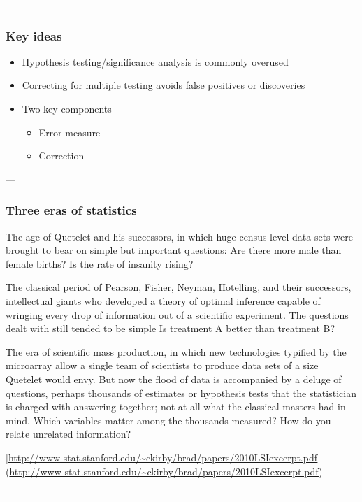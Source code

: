 \documentclass[10pt,article]{article}
\begin{document}
---
\subsubsection{Key ideas}
\label{sec:orga4bee19}

\begin{itemize}
\item Hypothesis testing/significance analysis is commonly overused
\item Correcting for multiple testing avoids false positives or discoveries
\item Two key components
\begin{itemize}
\item Error measure
\item Correction
\end{itemize}
\end{itemize}


---

\subsubsection{Three eras of statistics}
\label{sec:org6edcfbd}

The age of Quetelet and his successors, in which huge census-level data sets were brought to bear on simple but important questions: Are there more male than female births? Is the rate of insanity rising?

The classical period of Pearson, Fisher, Neyman, Hotelling, and their successors, intellectual giants who developed a theory of optimal inference capable of wringing every drop of information out of a scientific experiment. The questions dealt with still tended to be simple Is treatment A better than treatment B?

The era of scientific mass production, in which new technologies typified by the microarray allow a single team of scientists to produce data sets of a size Quetelet would envy. But now the flood of data is accompanied by a deluge of questions, perhaps thousands of estimates or hypothesis tests that the statistician is charged with answering together; not at all what the classical masters had in mind. Which variables matter among the thousands measured? How do you relate unrelated information?

[\url{http://www-stat.stanford.edu/\~ckirby/brad/papers/2010LSIexcerpt.pdf}](\url{http://www-stat.stanford.edu/\~ckirby/brad/papers/2010LSIexcerpt.pdf})

---
\end{document}
